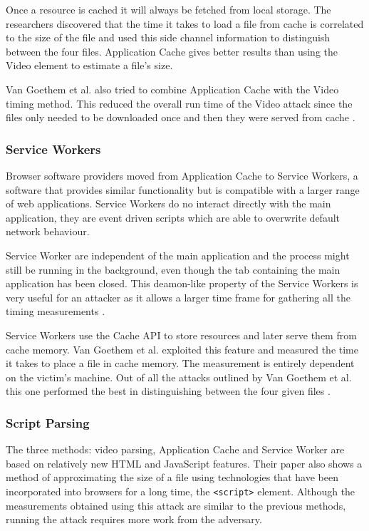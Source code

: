 \documentclass[10pt,a4paper,twoside]{book}
\begin{document}
Once a resource is cached it will always be fetched from local storage. The researchers discovered that the time it takes to load a file from cache is correlated to the size of the file and used this side channel information to distinguish between the four files. Application Cache gives better results than using the Video element to estimate a file's size.

Van Goethem et al. also tried to combine Application Cache with the Video timing method. This reduced the overall run time of the Video attack since the files only needed to be downloaded once and then they were served from cache \cite{van2015clock}.

\subsubsection{Service Workers}
Browser software providers moved from Application Cache to Service Workers, a software that provides similar functionality but is compatible with a larger range of web applications. Service Workers do no interact directly with the main application, they are event driven scripts which are able to overwrite default network behaviour. 

Service Worker are independent of the main application and the process might still be running in the background, even though the tab containing the main application has been closed. This deamon-like property of the Service Workers is very useful for an attacker as it allows a larger time frame for gathering all the timing measurements \cite{van2015clock}.

Service Workers use the Cache API to store resources and later serve them from cache memory. Van Goethem et al. exploited this feature and measured the time it takes to place a file in cache memory. The measurement is entirely dependent on the victim's machine. Out of all the attacks outlined by Van Goethem et al. this one performed the best in distinguishing between the four given files \cite{van2015clock}.

\subsubsection{Script Parsing}
The three methods: video parsing, Application Cache and Service Worker are based on relatively new HTML and JavaScript features. Their paper also shows a method of approximating the size of a file using technologies that have been incorporated into browsers for a long time, the \texttt{<script>} element. Although the measurements obtained using this attack are similar to the previous methods, running the attack requires more work from the adversary.
\end{document}
